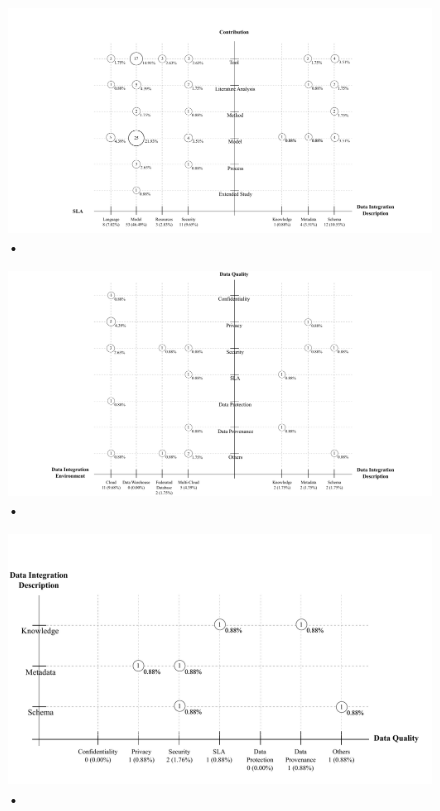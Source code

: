 \begin{figure}[hbtp]
\caption{•}
\centering
\includegraphics[scale=0.5]{figs/bubble-charts/Contribution-SLA-DIdescription.pdf} 
\end{figure}

\begin{figure}[hbtp]
\caption{•}
\centering
\includegraphics[scale=0.5]{figs/bubble-charts/Data-Quality-DI.pdf}
\end{figure}

\begin{figure}[hbtp]
\caption{•}
\centering
\includegraphics[scale=0.7]{figs/bubble-charts/DI-Description-Data-Quality.pdf}
\end{figure}

